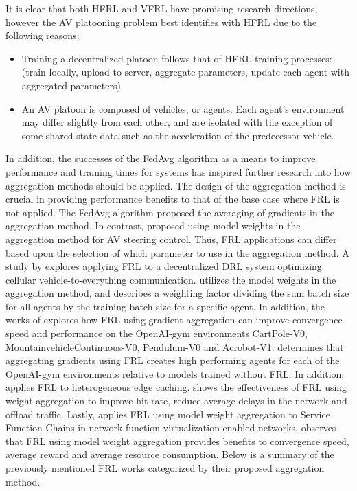 It is clear that both HFRL and VFRL have promising research directions, however
the AV platooning problem best identifies with HFRL due to the following reasons:

\begin{itemize}
  \item Training a decentralized platoon follows that of HFRL
  training processes: (train locally, upload to server, aggregate parameters, update
  each agent with aggregated parameters)
  \item An AV platoon is composed of vehicles, or agents. Each agent's environment may
  differ slightly from each other, and are isolated with the exception of some shared state
  data such as the acceleration of the predecessor vehicle.
\end{itemize}

In addition, the successes of the FedAvg algorithm as a means to improve performance and training
times for systems has inspired further research into how aggregation methods should
be applied.  The design of the aggregation method is crucial in providing performance
benefits to that of the base case where FRL is not applied.  The FedAvg
\cite{BrendanMcMahan2017a} algorithm proposed the averaging of gradients in the
aggregation method.  In contrast, \cite{Liang2019} proposed using model weights in
the aggregation method for AV steering control. Thus, FRL applications can differ
based upon the selection of which parameter to use in the aggregation method.  A study
by \cite{ZhangX2020} explores applying FRL to a decentralized DRL system optimizing
cellular vehicle-to-everything communication. \cite{ZhangX2020} utilizes the model
weights in the aggregation method, and describes a weighting factor dividing the sum
batch size for all agents by the training batch size for a specific agent.  In addition,
the works of \cite{LimHyun2021} explores how FRL using gradient aggregation can improve
convergence speed and performance on the OpenAI-gym environments CartPole-V0,
MountainvehicleContinuous-V0, Pendulum-V0 and Acrobot-V1.  \cite{LimHyun2021} determines
that aggregating gradients using FRL creates high performing agents for each of the
OpenAI-gym environments relative to models trained without FRL.  In addition,
\cite{WangXiaofei2021} applies FRL to heterogeneous edge caching.  \cite{WangXiaofei2021}
shows the effectiveness of FRL using weight aggregation to improve hit rate, reduce
average delays in the network and offload traffic. Lastly, \cite{Huang2021} applies FRL
using model weight aggregation to Service Function Chains in network function virtualization
enabled networks. \cite{Huang2021} observes that FRL using model weight aggregation
provides benefits to convergence speed, average reward and average resource consumption.
Below is a summary of the previously mentioned FRL works categorized by their proposed
aggregation method.


